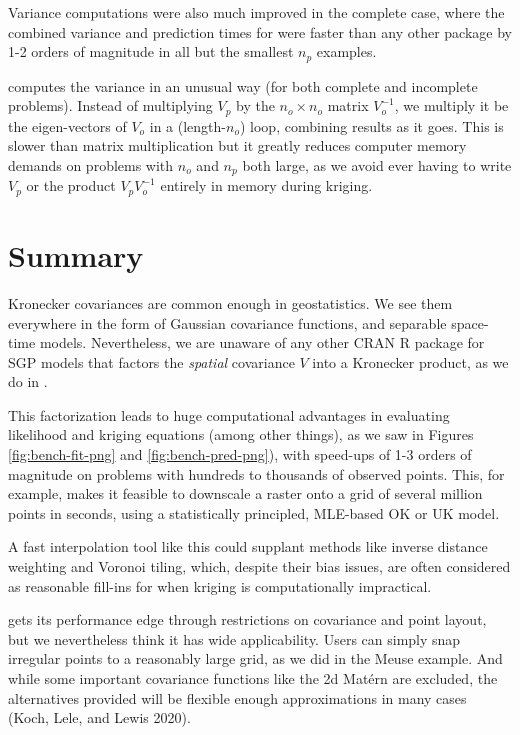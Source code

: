 Variance computations were also much improved in the complete case, where the combined variance and prediction times for  were faster than any other package by 1-2 orders of magnitude in all but the smallest \(n_p\) examples.

 computes the variance in an unusual way (for both complete and incomplete problems). Instead of multiplying \(V_p\) by the \(n_o \times n_o\) matrix \(V_o^{-1}\), we multiply it be the eigen-vectors of \(V_o\) in a (length-\(n_o\)) loop, combining results as it goes. This is slower than matrix multiplication but it greatly reduces computer memory demands on problems with \(n_o\) and \(n_p\) both large, as we avoid ever having to write \(V_p\) or the product \(V_p V_o^{-1}\) entirely in memory during kriging.

\hypertarget{summary}{%
\section{Summary}\label{summary}}

Kronecker covariances are common enough in geostatistics. We see them everywhere in the form of Gaussian covariance functions, and separable space-time models. Nevertheless, we are unaware of any other CRAN R package for SGP models that factors the \emph{spatial} covariance \(V\) into a Kronecker product, as we do in .

This factorization leads to huge computational advantages in evaluating likelihood and kriging equations (among other things), as we saw in Figures \ref{fig:bench-fit-png} and \ref{fig:bench-pred-png}), with speed-ups of 1-3 orders of magnitude on problems with hundreds to thousands of observed points. This, for example, makes it feasible to downscale a raster onto a grid of several million points in seconds, using a statistically principled, MLE-based OK or UK model.

A fast interpolation tool like this could supplant methods like inverse distance weighting and Voronoi tiling, which, despite their bias issues, are often considered as reasonable fill-ins for when kriging is computationally impractical.

 gets its performance edge through restrictions on covariance and point layout, but we nevertheless think it has wide applicability. Users can simply snap irregular points to a reasonably large grid, as we did in the Meuse example. And while some important covariance functions like the 2d Matérn are excluded, the alternatives provided will be flexible enough approximations in many cases (Koch, Lele, and Lewis 2020).


